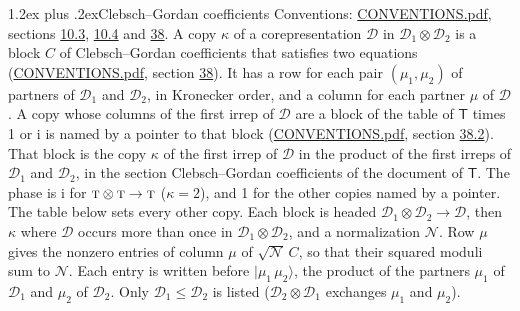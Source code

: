 \documentclass[10pt,a4paper]{article}
\makeatletter
\renewcommand\section{\@startsection{section}{1}{\z@}{-3ex plus -1ex minus -.2ex}%
  {1.2ex plus .2ex}{\normalfont\large\sffamily\bfseries\color{parttitle}}}
\numberwithin{equation}{section}
\newcommand{\grp}[1]{\mathsf{#1}}
\newcommand{\irr}[1]{\text{\normalfont\scshape #1}}
\newcommand{\iunit}{\mathrm{i}}
\newcommand{\irrprod}{\otimes}
\newcommand{\mult}{\kappa}
\newcommand{\intx}{\mu}
\newcommand{\cgnorm}{\mathcal{N}}
\newcommand{\prodket}[2]{\lvert {#1}\,{#2}\rangle}
\makeatother
\begin{document}
\section{Clebsch--Gordan coefficients}\label{s:clebsch_gordan}
Conventions: \href{../../CONVENTIONS.pdf}{CONVENTIONS.pdf}, sections \href{../../../rotation/CONVENTIONS.pdf\#conv.10.3}{10.3}, \href{../../../rotation/CONVENTIONS.pdf\#conv.10.4}{10.4} and \href{../../CONVENTIONS.pdf\#conv.38}{38}.
\leavevmode\label{n:index.copy}\label{n:matrix.cg.stored}A copy $\mult$ of a corepresentation $\mathcal{D}$ in $\mathcal{D}_1\irrprod\mathcal{D}_2$ is a block $C$ of Clebsch--Gordan coefficients that satisfies two equations (\href{../../CONVENTIONS.pdf}{CONVENTIONS.pdf}, section \href{../../CONVENTIONS.pdf\#conv.38}{38}). \label{n:index.cg}It has a row for each pair $(\intx_1, \intx_2)$ of partners of $\mathcal{D}_1$ and $\mathcal{D}_2$, in Kronecker order, and a column for each partner $\intx$ of $\mathcal{D}$.
A copy whose columns of the first irrep of $\mathcal{D}$ are a block of the table of $\grp{T}$ times 1 or $\iunit$ is named by a pointer to that block (\href{../../CONVENTIONS.pdf}{CONVENTIONS.pdf}, section \href{../../CONVENTIONS.pdf\#conv.38.2}{38.2}). That block is the copy $\mult$ of the first irrep of $\mathcal{D}$ in the product of the first irreps of $\mathcal{D}_1$ and $\mathcal{D}_2$, in the section Clebsch--Gordan coefficients of the document of \href{../../../rotation/data/pdf/T.pdf}{$\grp{T}$}. The phase is $\iunit$ for $\irr{t}\irrprod \irr{t}\to \irr{t}$ ($\mult = 2$), and 1 for the other copies named by a pointer. The table below sets every other copy.
Each block is headed $\mathcal{D}_1\irrprod\mathcal{D}_2\to\mathcal{D}$, then $\mult$ where $\mathcal{D}$ occurs more than once in $\mathcal{D}_1\irrprod\mathcal{D}_2$, and a normalization $\cgnorm$. Row $\intx$ gives the nonzero entries of column $\intx$ of $\sqrt{\cgnorm}\,C$, so that their squared moduli sum to $\cgnorm$. \label{n:vector.ket.product}Each entry is written before $\prodket{\intx_1}{\intx_2}$, the product of the partners $\intx_1$ of $\mathcal{D}_1$ and $\intx_2$ of $\mathcal{D}_2$. Only $\mathcal{D}_1 \le \mathcal{D}_2$ is listed ($\mathcal{D}_2\irrprod\mathcal{D}_1$ exchanges $\intx_1$ and $\intx_2$).
\end{document}
